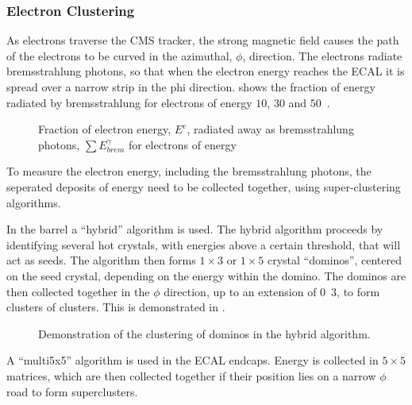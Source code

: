 \subsubsection{Electron Clustering}
As electrons traverse the CMS tracker, the strong magnetic field causes the path
of the electrons to be curved in the azimuthal, $\phi$, direction. The electrons
radiate bremsstrahlung photons, so that when the electron energy reaches the
ECAL it is spread over a narrow strip in the phi direction.
 shows the fraction of energy radiated by bremsstrahlung for
electrons of energy $10$, $30$ and \unit{$50$}{\GeV}.

\begin{figure}[htb]
  \centering
  \caption{Fraction of electron energy, $E^{e}$, radiated away as bremsstrahlung
photons, $\sum E_{brem}^{\gamma}$ for electrons of energy }%
  \label{reco:brem}
\end{figure}

To measure the electron energy, including the bremsstrahlung photons, the
seperated deposits of energy need to be collected together, using super-clustering
algorithms. 

In the barrel a ``hybrid'' algorithm is used. The hybrid algorithm proceeds by
identifying several hot crystals, with energies above a certain threshold, that
will act as seeds. The algorithm then forms $1\times3$ or $1\times5$ crystal
``dominos'', centered on the seed crystal, depending on the energy within the
domino. The dominos are then collected together in the $\phi$ direction, up to
an extension of \unit{0.3}{\rad}, to form clusters of clusters. This is
demonstrated in .

\begin{figure}[htb]
  \centering
  \caption{Demonstration of the clustering of dominos in the hybrid algorithm.}
  \label{reco:hybrid}
\end{figure}

A ``multi5x5'' algorithm is used in the ECAL endcaps. Energy is collected in
$5\times5$ matrices, which are then collected together if their position lies on
a narrow $\phi$ road to form superclusters.

